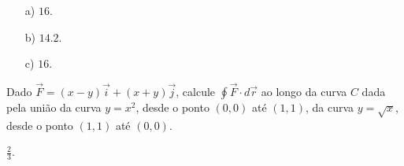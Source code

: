 \begin{resp}
 \begin{itemize}
  \item[a)] $16$.
  \item[b)] $14.2$.
  \item[c)] $16$.
 \end{itemize}
\end{resp}
\begin{exer}
 Dado $\vec{F}=(x-y)\vec{i}+(x+y)\vec{j}$, calcule $\oint\vec{F}\cdot d\vec{r}$ ao longo da curva $C$ dada pela união da curva $y=x^2$, desde o ponto $(0,0)$ até $(1,1)$, da curva $y=\sqrt{x}$, desde o ponto $(1,1)$ até $(0,0)$.
\end{exer}
\begin{resp}
 $\frac{2}{3}$.
\end{resp}




